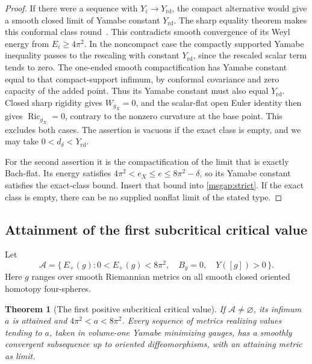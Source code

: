 \documentclass[11pt]{article}
\numberwithin{equation}{section}
\newtheorem{theorem}{Theorem}[section]
\theoremstyle{definition}
\theoremstyle{remark}
\DeclareMathOperator{\Ric}{Ric}
\newcommand{\rd}{\mathrm{rd}}
\begin{document}
\begin{proof}
If there were a sequence with \(Y_i\to Y_{\rd}\), the compact
alternative would give a smooth closed limit of Yamabe constant
\(Y_{\rd}\). The sharp equality theorem makes this conformal
class round~\cite[Theorem 2]{Schoen1984Yamabe}. This contradicts
smooth convergence of its Weyl energy from \(E_i\ge4\pi^2\).
In the noncompact case the compactly supported Yamabe inequality
passes to the rescaling with constant \(Y_{\rd}\), since the
rescaled scalar term tends to zero. The one-ended smooth
compactification has Yamabe constant equal to that compact-support
infimum, by conformal covariance and zero capacity of the added
point. Thus its Yamabe constant must also equal \(Y_{\rd}\).
Closed sharp rigidity gives \(W_{g_X}=0\), and the scalar-flat open
Euler identity then gives \(\Ric_{g_X}=0\), contrary to the
nonzero curvature at the base point. This excludes both cases.
The assertion is vacuous if the exact class is empty, and we
may take \(0<d_\delta<Y_{\rd}\).

For the second assertion it is the compactification of the
limit that is exactly Bach-flat. Its energy satisfies
\(4\pi^2<e_X\le e\le8\pi^2-\delta\), so its Yamabe constant
satisfies the exact-class bound. Insert that bound into
\eqref{msgap:strict}. If the exact class is empty, there can be
no supplied nonflat limit of the stated type.
\end{proof}

\subsection{Attainment of the first subcritical critical value}

Let
\begin{equation}\label{msgap:critical-set}
 \mathcal A=\{\,E_+(g): 0<E_+(g)<8\pi^2,\quad B_g=0,\quad Y([g])>0\,\}.
\end{equation}
Here \(g\) ranges over smooth Riemannian metrics on all smooth closed
oriented homotopy four-spheres.

\begin{theorem}[The first positive subcritical critical value]
\label{msgap:minimum}
If \(\mathcal A\ne\varnothing\), its infimum \(a\) is attained and
\(4\pi^2<a<8\pi^2\). Every sequence of metrics realizing values
tending to \(a\), taken in volume-one Yamabe minimizing gauges,
has a smoothly convergent subsequence up to oriented diffeomorphisms,
with an attaining metric as limit.
\end{theorem}
\end{document}
